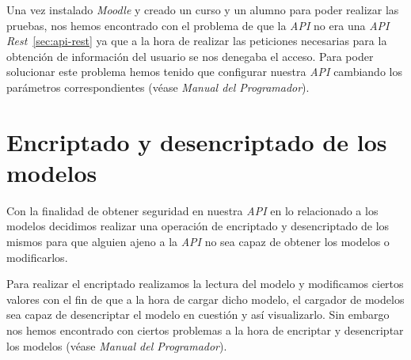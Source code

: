 Una vez instalado \textit{Moodle} y creado un curso y un alumno para poder realizar las pruebas, nos hemos encontrado con el problema de que la \textit{API} no era una \textit{API Rest}~\ref{sec:api-rest} ya que a la hora de realizar las peticiones necesarias para la obtención de información del usuario se nos denegaba el acceso. Para poder solucionar este problema hemos tenido que configurar nuestra \textit{API} cambiando los parámetros correspondientes (véase \textit{Manual del Programador}).

\section{Encriptado y desencriptado de los modelos}
Con la finalidad de obtener seguridad en nuestra \textit{API} en lo relacionado a los modelos decidimos realizar una operación de encriptado y desencriptado de los mismos para que alguien ajeno a la \textit{API} no sea capaz de obtener los modelos o modificarlos.

Para realizar el encriptado realizamos la lectura del modelo y modificamos ciertos valores con el fin de que a la hora de cargar dicho modelo, el cargador de modelos sea capaz de desencriptar el modelo en cuestión y así visualizarlo. Sin embargo nos hemos encontrado con ciertos problemas a la hora de encriptar y desencriptar los modelos (véase \textit{Manual del Programador}).